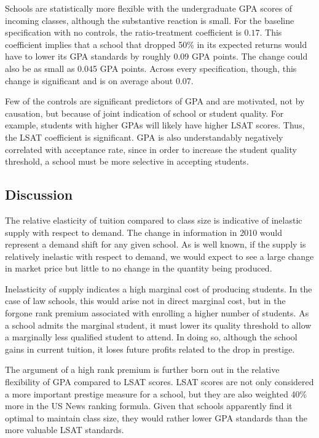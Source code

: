 \documentclass[12pt]{article}
\theoremstyle{definition}
\begin{document}
Schools are statistically more flexible with the undergraduate GPA scores of incoming classes, although the substantive reaction is small. For the baseline specification with no controls, the ratio-treatment coefficient is $0.17$. This coefficient implies that a school that dropped 50\% in its expected returns would have to lower its GPA standards by roughly 0.09 GPA points. The change could also be as small as 0.045 GPA points. Across every specification, though, this change is significant and is on average about 0.07.

Few of the controls are significant predictors of GPA and are motivated, not by causation, but because of joint indication of school or student quality. For example, students with higher GPAs will likely have higher LSAT scores. Thus, the LSAT coefficient is significant. GPA is also understandably negatively correlated with acceptance rate, since in order to increase the student quality threshold, a school must be more selective in accepting students.

\subsection{Discussion}

The relative elasticity of tuition compared to class size is indicative of inelastic supply with respect to demand. The change in information in 2010 would represent a demand shift for any given school. As is well known, if the supply is relatively inelastic with respect to demand, we would expect to see a large change in market price but little to no change in the quantity being produced.

Inelasticity of supply indicates a high marginal cost of producing students. In the case of law schools, this would arise not in direct marginal cost, but in the forgone rank premium associated with enrolling a higher number of students. As a school admits the marginal student, it must lower its quality threshold to allow a marginally less qualified student to attend. In doing so, although the school gains in current tuition, it loses future profits related to the drop in prestige.

The argument of a high rank premium is further born out in the relative flexibility of GPA compared to LSAT scores. LSAT scores are not only considered a more important prestige measure for a school, but they are also weighted 40\% more in the US News ranking formula. Given that schools apparently find it optimal to maintain class size, they would rather lower GPA standards than the more valuable LSAT standards.
\end{document}
